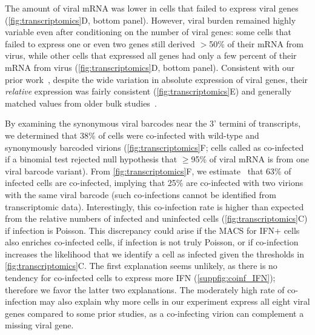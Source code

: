\documentclass[lineno]{asm-article}
\newcommand{\FIG}[1]{\autoref{fig:#1}}
\newcommand{\SUPPFIG}[1]{\autoref{suppfig:#1}}
\begin{document}
The amount of viral mRNA was lower in cells that failed to express viral genes (\FIG{transcriptomics}D, bottom panel).
However, viral burden remained highly variable even after conditioning on the number of viral genes: some cells that failed to express one or even two genes still derived $>$50\% of their mRNA from virus, while other cells that expressed all genes had only a few percent of their mRNA from virus (\FIG{transcriptomics}D, bottom panel).
Consistent with our prior work~\cite{russell2018extreme}, despite the wide variation in absolute expression of viral genes, their \emph{relative} expression was fairly consistent (\FIG{transcriptomics}E) and generally matched values from older bulk studies~\cite{hatada1989control}.

By examining the synonymous viral barcodes near the 3' termini of transcripts, we determined that 38\% of cells were co-infected with wild-type and synonymously barcoded virions (\FIG{transcriptomics}F; cells called as co-infected if a binomial test rejected null hypothesis that $\ge$95\% of viral mRNA is from one viral barcode variant).
From \FIG{transcriptomics}F, we estimate~\cite{bloom2018estimating} that 63\% of infected cells are co-infected, implying that 25\% are co-infected with two virions with the same viral barcode (such co-infections cannot be identified from transcriptomic data).
Interestingly, this co-infection rate is higher than expected from the relative numbers of infected and uninfected cells (\FIG{transcriptomics}C) if infection is Poisson.
This discrepancy could arise if the MACS for IFN+ cells also enriches co-infected cells, if infection is not truly Poisson, or if co-infection increases the likelihood that we identify a cell as infected given the thresholds in \FIG{transcriptomics}C.
The first explanation seems unlikely, as there is no tendency for co-infected cells to express more IFN (\SUPPFIG{coinf_IFN}); therefore we favor the latter two explanations.
The moderately high rate of co-infection may also explain why more cells in our experiment express all eight viral genes compared to some prior studies, as a co-infecting virion can complement a missing viral gene. 
\end{document}
